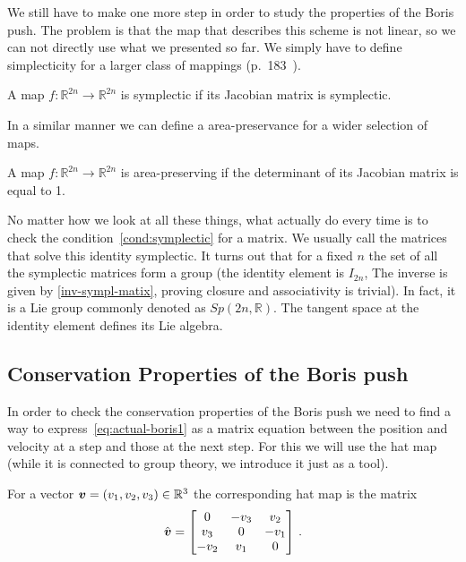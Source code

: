 \documentclass[12pt, class=report, crop=false]{standalone}
\begin{document}
We still have to make one more step in order to study the properties of the Boris push. The problem is that the map that describes this scheme is not linear, so we can not directly use what we presented so far. We simply have to define simplecticity for a larger class of mappings (p.~183~\cite{hairerGeometricNumericalIntegration2006}).

\begin{definition}
  A map \(f:\mathbb{R}^{2n}\rightarrow \mathbb{R}^{2n}\) is symplectic if its Jacobian matrix is symplectic.
\end{definition}

In a similar manner we can define a area-preservance for a wider selection of maps.

\begin{definition}
  A map \(f:\mathbb{R}^{2n}\rightarrow \mathbb{R}^{2n}\) is area-preserving if the determinant of its Jacobian matrix is equal to 1.
\end{definition}

No matter how we look at all these things, what actually do every time is to check the condition~\ref{cond:symplectic} for a matrix. We usually call the matrices that solve this identity symplectic. It turns out that for a fixed \(n\) the set of all the symplectic matrices form a group (the identity element is \(I_{2n}\), The inverse is given by \cref{inv-sympl-matix}, proving closure and associativity is trivial). In fact, it is a Lie group commonly denoted as \(Sp(2n,\mathbb{R})\). The tangent space at the identity element defines its Lie algebra.

\subsection{Conservation Properties of the Boris push}

In order to check the conservation properties of the Boris push we need to find a way to express~\cref{eq:actual-boris1} as a matrix equation between the position and velocity at a step and those at the next step. For this we will use the hat map (while it is connected to group theory, we introduce it just as a tool).

\begin{definition}
  For a vector \(\vb*{v} = (v_1, v_2,v_3) \in \mathbb{R}^3\) the corresponding hat map is the matrix
  \[
  \hat{\vb*{v}} =
  \begin{bmatrix}
    0 & -v_3 & v_2 \\
    v_3 & 0 & -v_1\\
    -v_2 & v_1 & 0
  \end{bmatrix}\,.
  \]
\end{definition}
\end{document}
